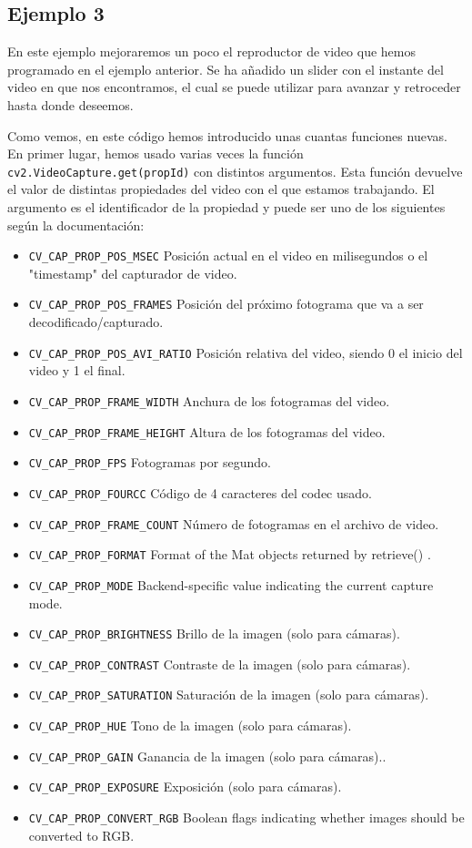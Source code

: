 \documentclass[a4paper,openright, 12pt]{book}
\begin{document}
\subsection*{Ejemplo 3}
En este ejemplo mejoraremos un poco el reproductor de video que hemos programado en el ejemplo anterior. Se ha añadido un slider con el instante del video en que nos encontramos, el cual se puede utilizar para avanzar y retroceder hasta donde deseemos.

Como vemos, en este código hemos introducido unas cuantas funciones nuevas.
En primer lugar, hemos usado varias veces la función \lstinline|cv2.VideoCapture.get(propId)| con distintos argumentos.
Esta función devuelve el valor de distintas propiedades del video con el que estamos trabajando. El argumento es el identificador de la propiedad y puede ser uno de los siguientes según la documentación:
\begin{itemize}

    \item \lstinline|CV_CAP_PROP_POS_MSEC| Posición actual en el video en milisegundos o el "timestamp" del capturador de video.
    \item \lstinline|CV_CAP_PROP_POS_FRAMES| Posición del próximo fotograma que va a ser decodificado/capturado.
    \item \lstinline|CV_CAP_PROP_POS_AVI_RATIO| Posición relativa del video, siendo 0 el inicio del video y 1 el final.
  
    \item \lstinline|CV_CAP_PROP_FRAME_WIDTH| Anchura de los fotogramas del video.
    \item \lstinline|CV_CAP_PROP_FRAME_HEIGHT| Altura de los fotogramas del video.
    \item \lstinline|CV_CAP_PROP_FPS| Fotogramas por segundo.
    \item \lstinline|CV_CAP_PROP_FOURCC| Código de 4 caracteres del codec usado.
    \item \lstinline|CV_CAP_PROP_FRAME_COUNT| Número de fotogramas en el archivo de video.
    \item \lstinline|CV_CAP_PROP_FORMAT| Format of the Mat objects returned by retrieve() .
    \item \lstinline|CV_CAP_PROP_MODE| Backend-specific value indicating the current capture mode.
    \item \lstinline|CV_CAP_PROP_BRIGHTNESS| Brillo de la imagen (solo para cámaras).
    \item \lstinline|CV_CAP_PROP_CONTRAST| Contraste de la imagen (solo para cámaras).
    \item \lstinline|CV_CAP_PROP_SATURATION| Saturación de la imagen (solo para cámaras).
    \item \lstinline|CV_CAP_PROP_HUE| Tono de la imagen (solo para cámaras).
    \item \lstinline|CV_CAP_PROP_GAIN| Ganancia de la imagen (solo para cámaras)..
    \item \lstinline|CV_CAP_PROP_EXPOSURE| Exposición (solo para cámaras).
    \item \lstinline|CV_CAP_PROP_CONVERT_RGB| Boolean flags indicating whether images should be converted to RGB.
\end{itemize}
\end{document}
